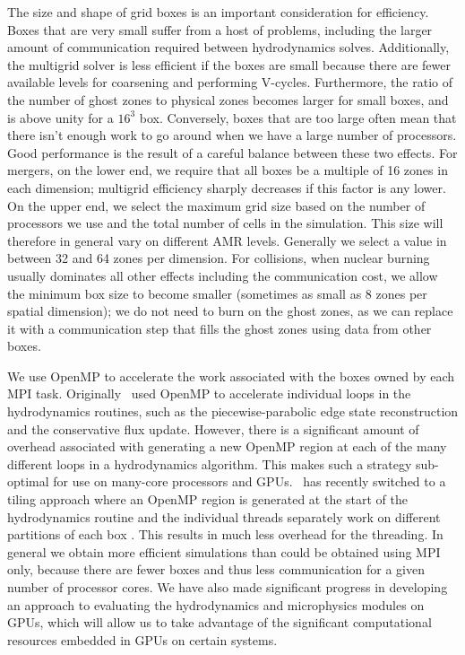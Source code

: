 \documentclass[12pt]{article}
\begin{document}
The size and shape of grid boxes is an important consideration for efficiency. 
Boxes that are very small suffer from a host of problems, including the larger 
amount of communication required between hydrodynamics solves. Additionally, 
the multigrid solver is less efficient if the boxes are small because there 
are fewer available levels for coarsening and performing V-cycles. Furthermore,
the ratio of the number of ghost zones to physical zones becomes larger for small
boxes, and is above unity for a $16^3$ box. Conversely, boxes that are too large
often mean that there isn't enough work to go around when we 
have a large number of processors. Good performance is the result of a careful 
balance between these two effects. For mergers, on the lower end, we require that
all boxes be a multiple of 16 zones in each dimension; multigrid efficiency sharply
decreases if this factor is any lower. On the upper end, we select the maximum grid size 
based on the number of processors we use and the total number of cells in the 
simulation. This size will therefore in general vary on different AMR levels. 
Generally we select a value in between 32 and 64 zones per dimension. For collisions,
when nuclear burning usually dominates all other effects including the communication cost,
we allow the minimum box size to become smaller (sometimes as small as 8 zones per
spatial dimension); we do not need to burn on the ghost zones, as we can replace it with
a communication step that fills the ghost zones using data from other boxes.

We use OpenMP to accelerate the work associated with the boxes owned
by each MPI task. Originally \castro\ used OpenMP to accelerate
individual loops in the hydrodynamics routines, such as the
piecewise-parabolic edge state reconstruction and the conservative
flux update. However, there is a significant amount of overhead
associated with generating a new OpenMP region at each of the many
different loops in a hydrodynamics algorithm. This makes such a
strategy sub-optimal for use on many-core processors and GPUs. \castro\ has
recently switched to a tiling approach where an OpenMP region is
generated at the start of the hydrodynamics routine and the individual
threads separately work on different partitions of each box \citep{boxlib-tiling}. This
results in much less overhead for the threading. In general we obtain
more efficient simulations than could be obtained using MPI only,
because there are fewer boxes and thus less communication for a given
number of processor cores. We have also made significant progress in
developing an approach to evaluating the hydrodynamics and microphysics modules on GPUs,
which will allow us to take advantage of the significant computational resources embedded in
GPUs on certain systems.
\end{document}

